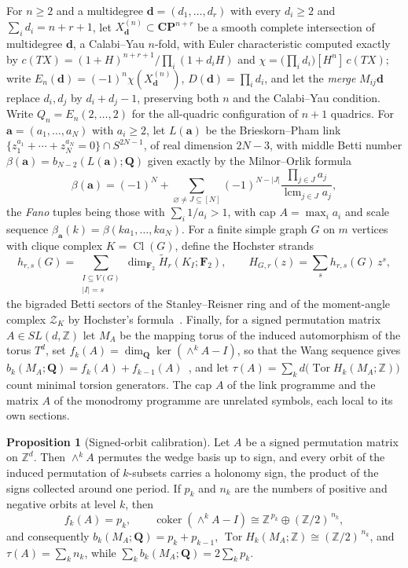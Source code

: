 \documentclass[11pt]{article}
\theoremstyle{definition}
\newcommand{\Z}{\mathbb Z}
\providecommand{\Z}{\mathbb Z}
\newtheorem{proposition}{Proposition}
\begin{document}
For $n\ge2$ and a multidegree $\mathbf d=(d_1,\ldots,d_r)$ with every $d_i\ge2$ and $\sum_id_i=n+r+1$, let $X^{(n)}_{\mathbf d}\subset\mathbf{CP}^{n+r}$ be a smooth complete intersection of multidegree $\mathbf d$, a Calabi--Yau $n$-fold, with Euler characteristic computed exactly by $c(TX)=(1+H)^{n+r+1}/\prod_i(1+d_iH)$ and $\chi=\bigl(\prod_id_i\bigr)[H^n]\,c(TX)$; write $E_n(\mathbf d)=(-1)^n\chi(X^{(n)}_{\mathbf d})$, $D(\mathbf d)=\prod_id_i$, and let the \emph{merge} $M_{ij}\mathbf d$ replace $d_i,d_j$ by $d_i+d_j-1$, preserving both $n$ and the Calabi--Yau condition.  Write $Q_n=E_n(2,\ldots,2)$ for the all-quadric configuration of $n+1$ quadrics.  For $\mathbf a=(a_1,\ldots,a_N)$ with $a_i\ge2$, let $L(\mathbf a)$ be the Brieskorn--Pham link $\{z_1^{a_1}+\cdots+z_N^{a_N}=0\}\cap S^{2N-1}$, of real dimension $2N-3$, with middle Betti number $\beta(\mathbf a)=b_{N-2}(L(\mathbf a);\mathbf Q)$ given exactly by the Milnor--Orlik formula~\cite{MO70}
\[
\beta(\mathbf a)=(-1)^N+\sum_{\varnothing\ne J\subseteq[N]}(-1)^{N-|J|}\frac{\prod_{j\in J}a_j}{\operatorname{lcm}_{j\in J}a_j},
\]
the \emph{Fano} tuples being those with $\sum_i1/a_i>1$, with cap $A=\max_ia_i$ and scale sequence $\beta_{\mathbf a}(k)=\beta(ka_1,\ldots,ka_N)$.  For a finite simple graph $G$ on $m$ vertices with clique complex $K=\operatorname{Cl}(G)$, define the Hochster strands
\[
h_{r,s}(G)=\sum_{\substack{I\subseteq V(G)\\|I|=s}}\dim_{\mathbf F_2}\widetilde H_r(K_I;\mathbf F_2),
\qquad
H_{G,r}(z)=\sum_sh_{r,s}(G)\,z^s,
\]
the bigraded Betti sectors of the Stanley--Reisner ring and of the moment-angle complex $\mathcal Z_K$ by Hochster's formula~\cite{Hoch77,BP15}.  Finally, for a signed permutation matrix $A\in SL(d,\Z)$ let $M_A$ be the mapping torus of the induced automorphism of the torus $T^d$, set $f_k(A)=\dim_{\mathbf Q}\ker(\wedge^kA-I)$, so that the Wang sequence gives $b_k(M_A;\mathbf Q)=f_k(A)+f_{k-1}(A)$~\cite{Wang49,Mil68}, and let $\tau(A)=\sum_kd\bigl(\operatorname{Tor}H_k(M_A;\Z)\bigr)$ count minimal torsion generators.  The cap $A$ of the link programme and the matrix $A$ of the monodromy programme are unrelated symbols, each local to its own sections.

\begin{proposition}[Signed-orbit calibration]\label{x:orbit}
Let $A$ be a signed permutation matrix on $\Z^d$.  Then $\wedge^kA$ permutes the wedge basis up to sign, and every orbit of the induced permutation of $k$-subsets carries a holonomy sign, the product of the signs collected around one period.  If $p_k$ and $n_k$ are the numbers of positive and negative orbits at level $k$, then
\[
f_k(A)=p_k,\qquad
\operatorname{coker}(\wedge^kA-I)\cong\Z^{\,p_k}\oplus(\Z/2)^{\,n_k},
\]
and consequently $b_k(M_A;\mathbf Q)=p_k+p_{k-1}$, $\operatorname{Tor}H_k(M_A;\Z)\cong(\Z/2)^{\,n_k}$, and $\tau(A)=\sum_kn_k$, while $\sum_kb_k(M_A;\mathbf Q)=2\sum_kp_k$.
\end{proposition}
\end{document}

